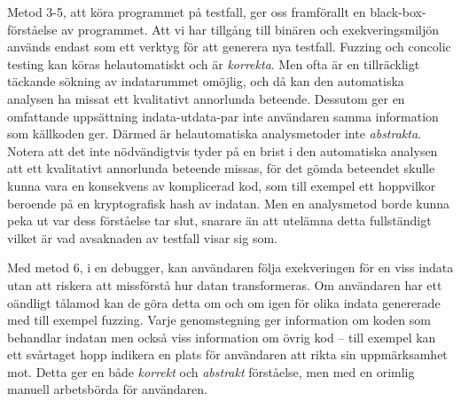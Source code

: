 Metod 3-5, att köra programmet på testfall, ger oss framförallt en black-box-förståelse av
programmet. Att vi har tillgång till binären och exekveringsmiljön används endast som ett verktyg
för att generera nya testfall. Fuzzing och concolic testing kan köras helautomatiskt och är
\textit{korrekta}. Men ofta är en tillräckligt täckande sökning av indatarummet omöjlig, och då kan
den automatiska analysen ha missat ett kvalitativt annorlunda beteende. Dessutom ger en omfattande
uppsättning indata-utdata-par inte användaren samma information som källkoden ger. Därmed är
helautomatiska analysmetoder inte \textit{abstrakta}. Notera att det inte nödvändigtvis tyder på en
brist i den automatiska analysen att ett kvalitativt annorlunda beteende missas, för det gömda
beteendet skulle kunna vara en konsekvens av komplicerad kod, som till exempel ett hoppvilkor
beroende på en kryptografisk hash av indatan. Men en analysmetod borde kunna peka ut var dess
förståelse tar slut, snarare än att utelämna detta fullständigt vilket är vad avsaknaden av testfall
visar sig som.

Med metod 6, i en debugger, kan användaren följa exekveringen för en viss indata utan att riskera
att missförstå hur datan transformeras. Om användaren har ett oändligt tålamod kan de göra detta om
och om igen för olika indata genererade med till exempel fuzzing. Varje genomstegning ger
information om koden som behandlar indatan men också viss information om övrig kod -- till exempel
kan ett svårtaget hopp indikera en plats för användaren att rikta sin uppmärksamhet mot. Detta ger
en både \textit{korrekt} och \textit{abstrakt} förståelse, men med en orimlig manuell arbetsbörda
för användaren.
